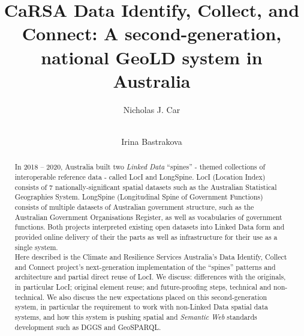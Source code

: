 \documentclass[runningheads]{llncs}
\begin{document}
\title{CaRSA Data Identify, Collect, and Connect: A second-generation, national GeoLD system in Australia}

\author{
    Nicholas J. Car \and \\
    Irina Bastrakova
}



\maketitle

\begin{abstract}
In 2018 – 2020, Australia built two \textit{Linked Data} ``spines'' - themed collections of interoperable reference data - called LocI and LongSpine. 
LocI (Location Index) consists of 7 nationally-significant spatial datasets such as the Australian Statistical Geographies System. 
LongSpine (Longitudinal Spine of Government Functions) consists of multiple datasets of Australian government structure, such as the 
Australian Government Organisations Register, as well as vocabularies of government functions. Both projects interpreted existing open 
datasets into Linked Data form and provided online delivery of their the parts as well as infrastructure for their use as a single system.\\

Here described is the Climate and Resilience Services Australia’s Data Identify, Collect and Connect project's next-generation 
implementation of the ``spines'' patterns and architecture and partial direct reuse of LocI. We discuss: differences with the originals, in particular LocI; original 
element reuse; and future-proofing steps, technical and non-technical. We also discuss the new expectations placed on this second-generation 
system, in particular the requirement to work with non-Linked Data spatial data systems, and how this system 
is pushing spatial and \textit{Semantic Web} standards development such as DGGS and GeoSPARQL.

\end{abstract}
\end{document}

